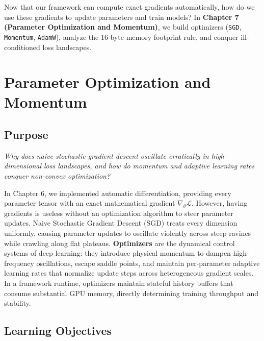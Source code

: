 \documentclass[
  letterpaper,
]{scrbook}
\begin{document}
Now that our framework can compute exact gradients automatically, how do
we use these gradients to update parameters and train models? In
\textbf{Chapter 7 (Parameter Optimization and Momentum)}, we build
optimizers (\texttt{SGD}, \texttt{Momentum}, \texttt{AdamW}), analyze
the 16-byte memory footprint rule, and conquer ill-conditioned loss
landscapes.

\chapter{Parameter Optimization and
Momentum}\label{parameter-optimization-and-momentum}

\section*{Purpose}\label{purpose-7}


\emph{Why does naive stochastic gradient descent oscillate erratically
in high-dimensional loss landscapes, and how do momentum and adaptive
learning rates conquer non-convex optimization?}

In Chapter 6, we implemented automatic differentiation, providing every
parameter tensor with an exact mathematical gradient
\(\nabla_\theta \mathcal{L}\). However, having gradients is useless
without an optimization algorithm to steer parameter updates. Naive
Stochastic Gradient Descent (SGD) treats every dimension uniformly,
causing parameter updates to oscillate violently across steep ravines
while crawling along flat plateaus. \textbf{Optimizers} are the
dynamical control systems of deep learning: they introduce physical
momentum to dampen high-frequency oscillations, escape saddle points,
and maintain per-parameter adaptive learning rates that normalize update
steps across heterogeneous gradient scales. In a framework runtime,
optimizers maintain stateful history buffers that consume substantial
GPU memory, directly determining training throughput and stability.

\section{Learning Objectives}\label{learning-objectives-7}
\end{document}
